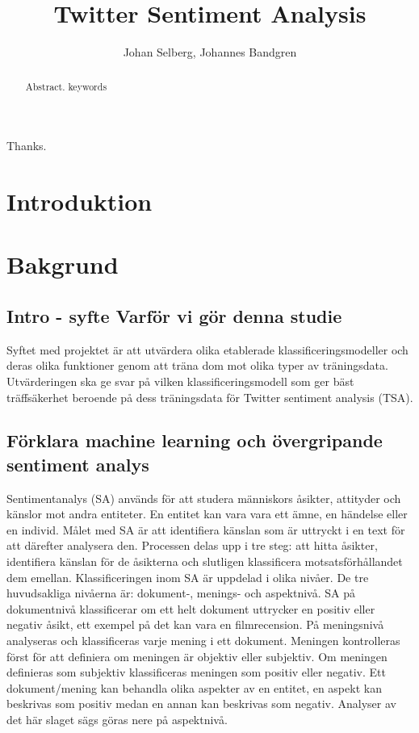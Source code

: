 \documentclass{kaumasters} %
\title{Twitter Sentiment Analysis}
\author{Johan Selberg, Johannes Bandgren}
\institute{Department of Computer Science}
\begin{document}
\maketitle



\frontmatter
\begin{abstract}
  Abstract.
  \keywords keywords
\end{abstract}
\approvalpage%
\begin{acknowledgements}
  Thanks.
\end{acknowledgements}

\tableofcontents{}
\mainmatter


\chapter{Introduktion}

\newpage


\chapter{Bakgrund}
\section{Intro - syfte Varför vi gör denna studie}
Syftet med projektet är att utvärdera olika etablerade klassificeringsmodeller och deras olika funktioner genom att träna dom mot olika typer av träningsdata. Utvärderingen ska ge svar på vilken klassificeringsmodell som ger bäst träffsäkerhet beroende på dess träningsdata för Twitter sentiment analysis (TSA).
\section{Förklara machine learning och övergripande sentiment analys}
Sentimentanalys (SA) används för att studera människors åsikter, attityder och känslor mot andra entiteter. En entitet kan vara vara ett ämne,  en händelse eller en individ. Målet med SA är att identifiera känslan som är uttryckt i en text för att därefter analysera den. Processen delas upp i tre steg: att hitta åsikter, identifiera känslan för de åsikterna och slutligen klassificera motsatsförhållandet dem emellan. Klassificeringen inom SA är uppdelad i olika nivåer. 
De tre huvudsakliga nivåerna är: dokument-, menings- och aspektnivå. SA på dokumentnivå klassificerar om ett helt dokument uttrycker en positiv eller negativ åsikt, ett exempel på det kan vara en filmrecension. 
På meningsnivå analyseras och klassificeras varje mening i ett dokument. Meningen kontrolleras först för att definiera om meningen är objektiv eller subjektiv. Om meningen definieras som subjektiv klassificeras meningen som positiv eller negativ. 
Ett dokument/mening kan behandla olika aspekter av en entitet, en aspekt kan beskrivas som positiv medan en annan kan beskrivas som negativ. Analyser av det här slaget sägs göras nere på aspektnivå.
\end{document}
